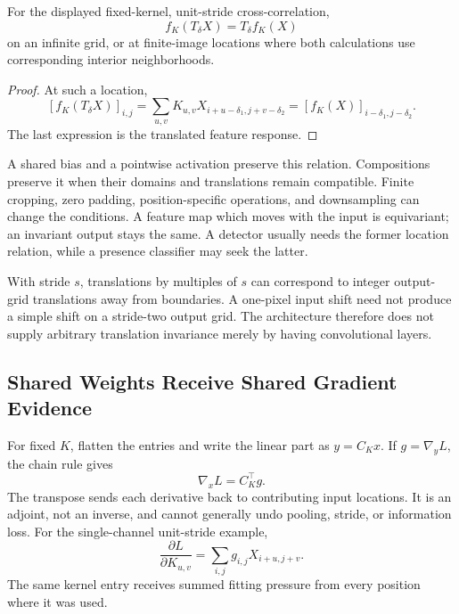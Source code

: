 \par\medskip\noindent\begin{minipage}{\linewidth}
\begin{theorem}
For the displayed fixed-kernel, unit-stride cross-correlation,
\[
f_K(T_\delta X)=T_\delta f_K(X)
\]
on an infinite grid, or at finite-image locations where both calculations use corresponding interior neighborhoods.
\end{theorem}
\begin{proof}
At such a location,
\[
[f_K(T_\delta X)]_{i,j}
=\sum_{u,v}K_{u,v}X_{i+u-\delta_1,j+v-\delta_2}
=[f_K(X)]_{i-\delta_1,j-\delta_2}.
\]
The last expression is the translated feature response.
\end{proof}
\end{minipage}\par\medskip

A shared bias and a pointwise activation preserve this relation. Compositions preserve it when their domains and translations remain compatible. Finite cropping, zero padding, position-specific operations, and downsampling can change the conditions. A feature map which moves with the input is equivariant; an invariant output stays the same. A detector usually needs the former location relation, while a presence classifier may seek the latter.

With stride $s$, translations by multiples of $s$ can correspond to integer output-grid translations away from boundaries. A one-pixel input shift need not produce a simple shift on a stride-two output grid. The architecture therefore does not supply arbitrary translation invariance merely by having convolutional layers.

\subsection{Shared Weights Receive Shared Gradient Evidence}

For fixed $K$, flatten the entries and write the linear part as $y=C_Kx$. If $g=\nabla_yL$, the chain rule gives
\[
\nabla_xL=C_K^\top g.
\]
The transpose sends each derivative back to contributing input locations. It is an adjoint, not an inverse, and cannot generally undo pooling, stride, or information loss. For the single-channel unit-stride example,
\[
\frac{\partial L}{\partial K_{u,v}}=\sum_{i,j}g_{i,j}X_{i+u,j+v}.
\]
The same kernel entry receives summed fitting pressure from every position where it was used.

